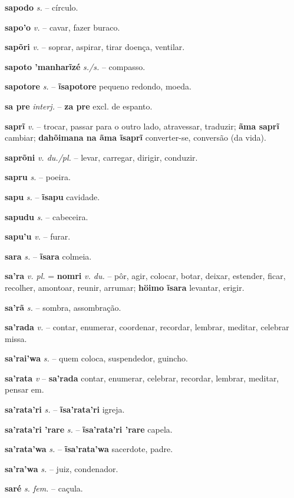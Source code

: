 \textbf{sapodo} \textit{s.} -- círculo.

\textbf{sapo'o} \textit{v.} -- cavar, fazer buraco.

\textbf{sapõri} \textit{v.} -- soprar, aspirar, tirar doença, ventilar.

\textbf{sapoto 'manharĩzé} \textit{s./s.} -- compasso.

\textbf{sapotore} \textit{s.} -- \textbf{ĩsapotore} pequeno redondo, moeda.

\textbf{sa pre} \textit{interj.} -- \textbf{za pre} excl. de espanto.

\textbf{saprĩ} \textit{v.} -- trocar, passar para o outro lado, atravessar, traduzir; \textbf{ãma saprĩ} cambiar; \textbf{dahõimana na ãma ĩsaprĩ} converter-se, conversão (da vida).

\textbf{saprõni} \textit{v. du./pl.} -- levar, carregar, dirigir, conduzir.

\textbf{sapru} \textit{s.} -- poeira.

\textbf{sapu} \textit{s.} -- \textbf{ĩsapu} cavidade.

\textbf{sapudu} \textit{s.} -- cabeceira.

\textbf{sapu'u} \textit{v.} -- furar.

\textbf{sara} \textit{s.} -- \textbf{ĩsara} colmeia.

\textbf{sa'ra} \textit{v. pl.} = \textbf{nomri} \textit{v. du.} -- pôr, agir, colocar, botar, deixar, estender, ficar, recolher, amontoar, reunir, arrumar; \textbf{höimo ĩsara} levantar, erigir.

\textbf{sa'rã} \textit{s.} -- sombra, assombração.

\textbf{sa'rada} \textit{v.} -- contar, enumerar, coordenar, recordar, lembrar, meditar, celebrar missa.

\textbf{sa'rai'wa} \textit{s.} -- quem coloca, suspendedor, guincho.

\textbf{sa'rata} \textit{v} -- \textbf{sa'rada} contar, enumerar, celebrar, recordar, lembrar, meditar, pensar em.

\textbf{sa'rata'ri} \textit{s.} -- \textbf{ĩsa'rata'ri} igreja.

\textbf{sa'rata'ri 'rare} \textit{s.} -- \textbf{ĩsa'rata'ri 'rare} capela.

\textbf{sa'rata'wa} \textit{s.} -- \textbf{ĩsa'rata'wa} sacerdote, padre.

\textbf{sa'ra'wa} \textit{s.} -- juiz, condenador.

\textbf{saré} \textit{s. fem.} -- caçula.

